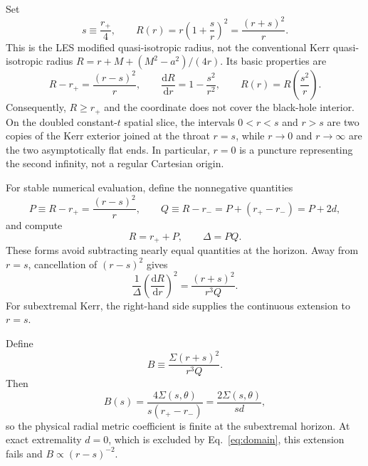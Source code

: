 \documentclass[11pt]{article}
\newcommand{\dd}{\mathrm{d}}
\newcommand{\RBL}{R}
\begin{document}
Set
\begin{equation}
 s\equiv\frac{r_+}{4},
 \qquad
 \RBL(r)=r\left(1+\frac{s}{r}\right)^2
          =\frac{(r+s)^2}{r}. \label{eq:LESmap}
\end{equation}
This is the LES modified quasi-isotropic radius, not the conventional Kerr quasi-isotropic radius $\RBL=r+M+(M^2-a^2)/(4r)$. Its basic properties are
\begin{equation}
 \RBL-r_+=\frac{(r-s)^2}{r},\qquad
 \frac{\dd\RBL}{\dd r}=1-\frac{s^2}{r^2},\qquad
 \RBL(r)=\RBL\!\left(\frac{s^2}{r}\right). \label{eq:mapproperties}
\end{equation}
Consequently, $\RBL\geq r_+$ and the coordinate does not cover the black-hole interior. On the doubled constant-$t$ spatial slice, the intervals $0<r<s$ and $r>s$ are two copies of the Kerr exterior joined at the throat $r=s$, while $r\to0$ and $r\to\infty$ are the two asymptotically flat ends. In particular, $r=0$ is a puncture representing the second infinity, not a regular Cartesian origin.

For stable numerical evaluation, define the nonnegative quantities
\begin{equation}
 P\equiv\RBL-r_+=\frac{(r-s)^2}{r},\qquad
 Q\equiv\RBL-r_-=P+(r_+-r_-)=P+2d, \label{eq:PQ}
\end{equation}
and compute
\begin{equation}
 \boxed{\RBL=r_++P,\qquad \Delta=PQ.} \label{eq:stableRDelta}
\end{equation}
These forms avoid subtracting nearly equal quantities at the horizon. Away from $r=s$, cancellation of $(r-s)^2$ gives
\begin{equation}
 \frac{1}{\Delta}\left(\frac{\dd\RBL}{\dd r}\right)^2
 =\frac{(r+s)^2}{r^3Q}. \label{eq:radialfactor}
\end{equation}
For subextremal Kerr, the right-hand side supplies the continuous extension to $r=s$.

Define
\begin{equation}
 B\equiv\frac{\Sigma(r+s)^2}{r^3Q}. \label{eq:Bdef}
\end{equation}
Then
\begin{equation}
 B(s)=\frac{4\Sigma(s,\theta)}{s(r_+-r_-)}
     =\frac{2\Sigma(s,\theta)}{sd}, \label{eq:Bhorizon}
\end{equation}
so the physical radial metric coefficient is finite at the subextremal horizon. At exact extremality $d=0$, which is excluded by Eq.~\eqref{eq:domain}, this extension fails and $B\propto(r-s)^{-2}$.
\end{document}
